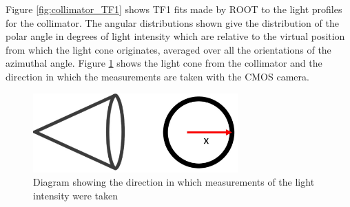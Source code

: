 Figure \ref{fig:collimator_TF1} shows TF1 fits made by ROOT to the light profiles for the collimator. The angular distributions shown give the distribution of the polar angle in degrees of light intensity which are relative to the virtual position from which the light cone originates, averaged over all the orientations of the azimuthal angle. Figure \ref{fig:collimator_test_schematic} shows the light cone from the collimator and the direction in which the measurements are taken with the CMOS camera.

\begin{figure}
    \centering
    \includegraphics[width=0.7\textwidth]{Figures/collimator_test_schematic.png}
    \caption{Diagram showing the direction in which measurements of the light intensity were taken}
    \label{fig:collimator_test_schematic}
\end{figure}

